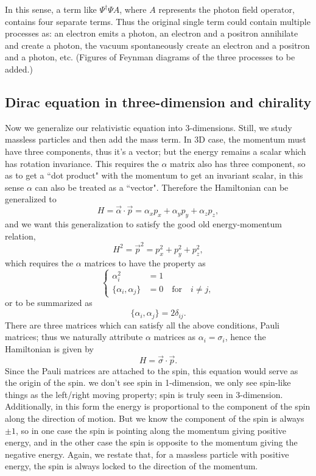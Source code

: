 \documentclass{article}
\newcommand{\be}{\begin{equation}}
\newcommand{\ee}{\end{equation}}
\renewcommand{\1}{\left}
\renewcommand{\2}{\right}
\newcommand{\al}{\alpha}
\newcommand{\sig}{\sigma}
\newcommand{\del}{\delta}
\begin{document}
In this sense, a term like $\Psi^\dag\Psi A$, where $A$ represents the photon field operator, contains four separate terms. Thus the original single term could contain multiple processes as: an electron emits a photon, an electron and a positron annihilate and create a photon, the vacuum spontaneously create an electron and a positron and a photon, etc. (Figures of Feynman diagrams of the three processes to be added.)

\subsection{Dirac equation in three-dimension and chirality}
Now we generalize our relativistic equation into 3-dimensions. Still, we study massless particles and then add the mass term. In 3D case, the momentum must have three components, thus it's a vector; but the energy remains a scalar which has rotation invariance. This requires the $\al$ matrix also has three component, so as to get a ``dot product" with the momentum to get an invariant scalar, in this sense $\al$ can also be treated as a ``vector". Therefore the Hamiltonian can be generalized to
\be H=\vec\al\cdot\vec p=\al_x p_x+\al_y p_y+\al_z p_z, \ee
and we want this generalization to satisfy the good old energy-momentum relation,
\be H^2=\vec p^2=p_x^2+p_y^2+p_z^2, \ee
which requires the $\al$ matrices to have the property as
\be\1\{\begin{split}
\al_i^2&=1\\
\{\al_i,\al_j\}&=0 \quad\text{for}\quad i\ne j,
\end{split}\2.\ee
or to be summarized as
\be \{\al_i,\al_j\}=2\del_{ij}. \ee
There are three matrices which can satisfy all the above conditions, Pauli matrices; thus we naturally attribute $\al$ matrices as $\al_i=\sig_i$, hence the Hamiltonian is given by \be H=\vec\sig\cdot\vec p. \ee Since the Pauli matrices are attached to the spin, this equation would serve as the origin of the spin. we don't see spin in 1-dimension, we only see spin-like things as the left/right moving property; spin is truly seen in 3-dimension. Additionally, in this form the energy is proportional to the component of the spin along the direction of motion. But we know the component of the spin is always $\pm 1$, so in one case the spin is pointing along the momentum giving positive energy, and in the other case the spin is opposite to the momentum giving the negative energy. Again, we restate that, for a massless particle with positive energy, the spin is always locked to the direction of the momentum.
\end{document}
